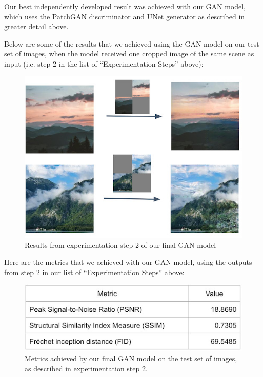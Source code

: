 \documentclass[sigconf]{acmart}
\begin{document}
Our best independently developed result was achieved with our GAN model, which uses the PatchGAN discriminator and UNet generator as described in greater detail above.

Below are some of the results that we achieved using the GAN model on our test set of images, when the model received one cropped image of the same scene as input (i.e. step 2 in the list of “Experimentation Steps” above):

\begin{figure}[h!]
    \centering
    \includegraphics[width=\linewidth]{gan_step_2}
    \caption{Results from experimentation step 2 of our final GAN model}
    \label{fig:gan_step_2}
\end{figure}

Here are the metrics that we achieved with our GAN model, using the outputs from step 2 in our list of “Experimentation Steps” above:

\begin{figure}[h!]
    \centering
    \includegraphics[width=\linewidth]{gan_metrics}
    \caption{Metrics achieved by our final GAN model on the test set of images, as described in experimentation step 2.}
    \label{fig:gan_metrics}
\end{figure}
\end{document}
